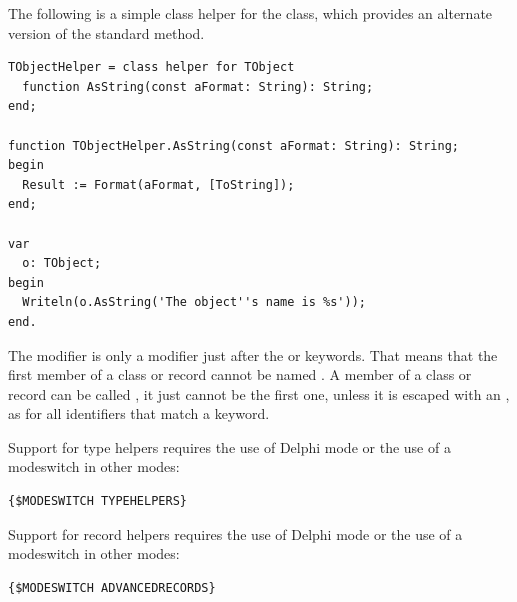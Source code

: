 The following is a simple class helper for the  class, which provides
an alternate version of the standard  method.
\begin{verbatim}
TObjectHelper = class helper for TObject
  function AsString(const aFormat: String): String;
end;

function TObjectHelper.AsString(const aFormat: String): String;
begin
  Result := Format(aFormat, [ToString]);
end;

var
  o: TObject;
begin
  Writeln(o.AsString('The object''s name is %s'));
end.
\end{verbatim}

\begin{remark}
The  modifier is only a modifier just after the  or
 keywords. That means that the first member of a class or record
cannot be named . A member of a class or record can be called
, it just cannot be the first one, unless it is escaped with an
\var{\&}, as for all identifiers that match a keyword.
\end{remark}

\begin{remark}
Support for type helpers requires the use of Delphi mode or the use of a
 modeswitch in other modes:
\begin{verbatim}
{$MODESWITCH TYPEHELPERS}
\end{verbatim}
\end{remark}

\begin{remark}
Support for record helpers requires the use of Delphi mode or the use of a
 modeswitch in other modes:
\begin{verbatim}
{$MODESWITCH ADVANCEDRECORDS}
\end{verbatim}
\end{remark}


